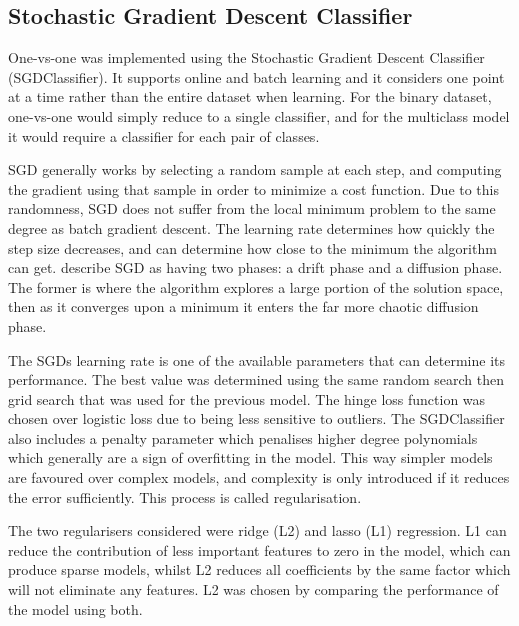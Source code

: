 \documentclass[12pt]{article}
\begin{document}
\subsection{Stochastic Gradient Descent Classifier}

One-vs-one was implemented using the Stochastic Gradient Descent Classifier (SGDClassifier). It supports online and batch learning and it considers one point at a time rather than the entire dataset when learning. For the binary dataset, one-vs-one would simply reduce to a single classifier, and for the multiclass model it would require a classifier for each pair of classes.

SGD generally works by selecting a random sample at each step, and computing the gradient using that sample in order to minimize a cost function. Due to this randomness, SGD does not suffer from the local minimum problem to the same degree as batch gradient descent. The learning rate determines how quickly the step size decreases, and can determine how close to the minimum the algorithm can get. \cite{sgd} describe SGD as having two phases: a drift phase and a diffusion phase. The former is where the algorithm explores a large portion of the solution space, then as it converges upon a minimum it enters the far more chaotic diffusion phase. 

The SGDs learning rate is one of the available parameters that can determine its performance. The best value was determined using the same random search then grid search that was used for the previous model.
The hinge loss function was chosen over logistic loss due to being less sensitive to outliers. The SGDClassifier also includes a penalty parameter which penalises higher degree polynomials which generally are a sign of overfitting in the model. This way simpler models are favoured over complex models, and complexity is only introduced if it reduces the error sufficiently. This process is called regularisation.

The two regularisers considered were ridge (L2) and lasso (L1) regression. L1 can reduce the contribution of less important features to zero in the model, which can produce sparse models, whilst L2 reduces all coefficients by the same factor which will not eliminate any features. L2 was chosen by comparing the performance of the model using both.
\end{document}
